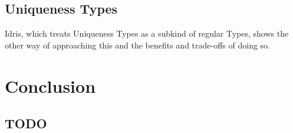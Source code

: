 \documentclass[onehalf,11pt]{beavtex}
\begin{document}
\section{Uniqueness Types}

Idris, which treats Uniqueness Types as a subkind of regular Types, shows
the other way of approaching this and the benefits and trade-offs of doing so.



\chapter{Conclusion}
\section{TODO}


{}

\end{document}
